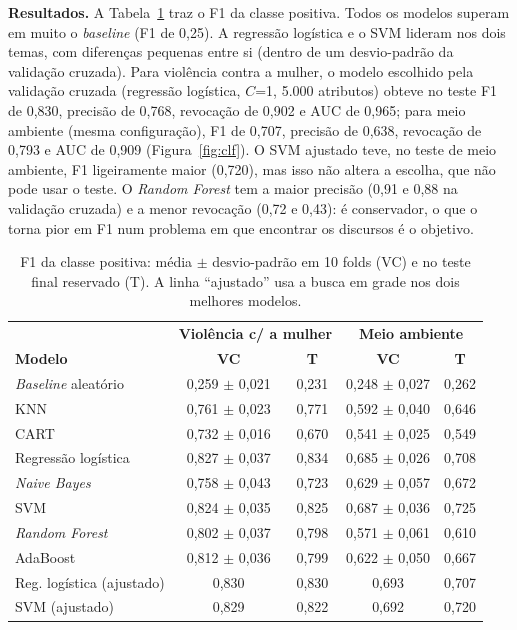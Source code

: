\documentclass[12pt]{article}
\begin{document}
\textbf{Resultados.} A Tabela~\ref{tab:clf} traz o F1 da classe positiva. Todos os modelos superam
em muito o \textit{baseline} (F1 de 0,25). A regressão logística e o SVM lideram nos dois temas,
com diferenças pequenas entre si (dentro de um desvio-padrão da validação cruzada). Para violência
contra a mulher, o modelo escolhido pela validação cruzada (regressão logística, $C$=1, 5.000
atributos) obteve no teste F1 de 0,830, precisão de 0,768, revocação de 0,902 e AUC de 0,965; para
meio ambiente (mesma configuração), F1 de 0,707, precisão de 0,638, revocação de 0,793 e AUC de
0,909 (Figura~\ref{fig:clf}). O SVM ajustado teve, no teste de meio ambiente, F1 ligeiramente
maior (0,720), mas isso não altera a escolha, que não pode usar o teste. O \textit{Random Forest}
tem a maior precisão (0,91 e 0,88 na validação cruzada) e a menor revocação (0,72 e 0,43): é
conservador, o que o torna pior em F1 num problema em que encontrar os discursos é o objetivo.

\begin{table}[ht]
\centering
\caption{F1 da classe positiva: média $\pm$ desvio-padrão em 10 folds (VC) e no teste final reservado (T). A linha ``ajustado'' usa a busca em grade nos dois melhores modelos.}
\label{tab:clf}
\footnotesize
\begin{tabular}{@{}lcccc@{}}
\toprule
 & \multicolumn{2}{c}{\textbf{Violência c/ a mulher}} & \multicolumn{2}{c}{\textbf{Meio ambiente}} \\
\textbf{Modelo} & \textbf{VC} & \textbf{T} & \textbf{VC} & \textbf{T} \\
\midrule
\textit{Baseline} aleatório & 0,259 $\pm$ 0,021 & 0,231 & 0,248 $\pm$ 0,027 & 0,262 \\
KNN                 & 0,761 $\pm$ 0,023 & 0,771 & 0,592 $\pm$ 0,040 & 0,646 \\
CART                & 0,732 $\pm$ 0,016 & 0,670 & 0,541 $\pm$ 0,025 & 0,549 \\
Regressão logística & 0,827 $\pm$ 0,037 & 0,834 & 0,685 $\pm$ 0,026 & 0,708 \\
\textit{Naive Bayes}& 0,758 $\pm$ 0,043 & 0,723 & 0,629 $\pm$ 0,057 & 0,672 \\
SVM                 & 0,824 $\pm$ 0,035 & 0,825 & 0,687 $\pm$ 0,036 & 0,725 \\
\textit{Random Forest} & 0,802 $\pm$ 0,037 & 0,798 & 0,571 $\pm$ 0,061 & 0,610 \\
AdaBoost            & 0,812 $\pm$ 0,036 & 0,799 & 0,622 $\pm$ 0,050 & 0,667 \\
\midrule
Reg. logística (ajustado) & 0,830 & 0,830 & 0,693 & 0,707 \\
SVM (ajustado)      & 0,829 & 0,822 & 0,692 & 0,720 \\
\bottomrule
\end{tabular}
\end{table}
\end{document}
